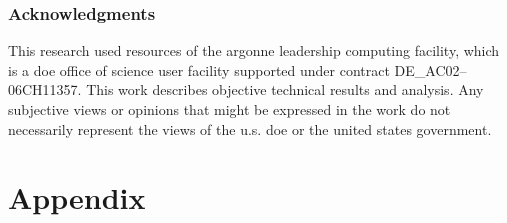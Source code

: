 \documentclass{article} %
\begin{document}
\subsubsection*{Acknowledgments}
This research used resources of the argonne leadership computing facility, which is a doe office of science user
facility supported under contract DE\_AC02--06CH11357.%
%
This work describes objective technical results and analysis.
%
Any subjective views or opinions that might be expressed in the work do not necessarily represent the views of the u.s.
doe or the united states government.






\appendix
\section{Appendix}
%
\end{document}
